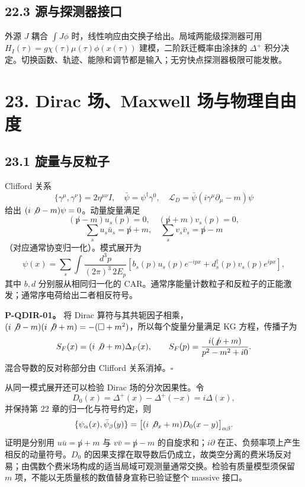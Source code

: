 \documentclass[
  11pt,
  oneside]{book}
\begin{document}
\hypertarget{ux6e90ux4e0eux63a2ux6d4bux5668ux63a5ux53e3}{%
\section{22.3
源与探测器接口}\label{ux6e90ux4e0eux63a2ux6d4bux5668ux63a5ux53e3}}

外源 \(J\) 耦合 \(\int J\phi\)
时，线性响应由交换子给出。局域两能级探测器可用
\(H_I(\tau)=g\chi(\tau)\mu(\tau)\phi(x(\tau))\)
建模，二阶跃迁概率由涂抹的 \(\Delta^+\)
积分决定。切换函数、轨迹、能隙和调节都是输入；无穷快点探测器极限可能发散。

\hypertarget{ch-23}{%
\chapter{23. Dirac 场、Maxwell 场与物理自由度}\label{ch-23}}

\hypertarget{ux65cbux91cfux4e0eux53cdux7c92ux5b50}{%
\section{23.1 旋量与反粒子}\label{ux65cbux91cfux4e0eux53cdux7c92ux5b50}}

Clifford 关系 \[
\{\gamma^\mu,\gamma^\nu\}=2\eta^{\mu\nu}I,\quad
\bar\psi=\psi^\dagger\gamma^0,\quad
\mathcal L_D=\bar\psi(i\gamma^\mu\partial_\mu-m)\psi
\] 给出 \((i\not\partial-m)\psi=0\)。动量旋量满足 \[
(\not p-m)u_s(p)=0,\quad(\not p+m)v_s(p)=0,
\] \[
\sum_su_s\bar u_s=\not p+m,\quad
\sum_sv_s\bar v_s=\not p-m
\] （对应通常协变归一化）。模式展开为 \[
\psi(x)=\sum_s\int\frac{d^3p}{(2\pi)^3\,2E_p}
\left[b_s(p)u_s(p)e^{-ipx}+d_s^\dagger(p)v_s(p)e^{ipx}\right],
\] 其中 \(b,d\) 分别服从相同归一化的
CAR。通常序能量计数粒子和反粒子的正能激发；通常序电荷给出二者相反符号。

\protect\hypertarget{p-qdir-01}{}{}

\textbf{P-QDIR-01。} 将 Dirac 算符与其共轭因子相乘，
\((i\not\partial-m)(i\not\partial+m)=-(\Box+m^2)\)，所以每个旋量分量满足
KG 方程，传播子为 \[
S_F(x)=(i\not\partial+m)\Delta_F(x),\qquad
S_F(p)=\frac{i(\not p+m)}{p^2-m^2+i0}.
\] 混合导数的反对称部分由 Clifford 关系消掉。\(\square\)

从同一模式展开还可以检验 Dirac 场的分次因果性。令 \[
D_0(x)=\Delta^+(x)-\Delta^+(-x)=i\Delta(x),
\] 并保持第 22 章的归一化与符号约定，则 \[
\{\psi_\alpha(x),\bar\psi_\beta(y)\}
=\bigl[(i\not\partial_x+m)D_0(x-y)\bigr]_{\alpha\beta}.
\] 证明是分别用 \(u\bar u=\not p+m\) 与 \(v\bar v=\not p-m\)
的自旋求和；\(i\partial\) 在正、负频率项上产生相反的动量符号。\(D_0\)
的因果支撑在取导数后仍成立，故类空分离的费米场反对易；由偶数个费米场构成的适当局域可观测量通常交换。检验有质量模型须保留
\(m\) 项，不能以无质量核的数值替身宣称已验证整个 massive 接口。
\end{document}

